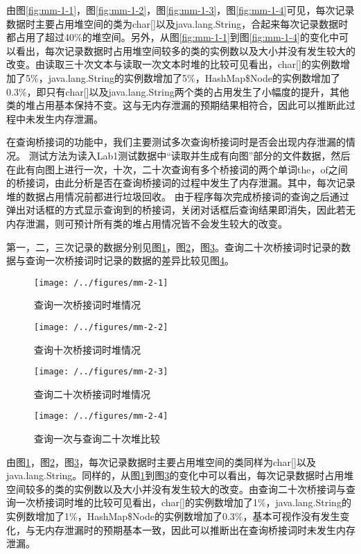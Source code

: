 由图\ref{fig:mm-1-1}，图\ref{fig:mm-1-2}，图\ref{fig:mm-1-3}，图\ref{fig:mm-1-4}可见，每次记录数据时主要占用堆空间的类为char[]以及java.lang.String，合起来每次记录数据时都占用了超过40\%的堆空间。另外，从图\ref{fig:mm-1-1}到图\ref{fig:mm-1-4}的变化中可以看出，每次记录数据时占用堆空间较多的类的实例数以及大小并没有发生较大的改变。由读取三十次文本与读取一次文本时堆的比较可见看出，char[]的实例数增加了5\%，java.lang.String的实例数增加了5\%，HashMap\$Node的实例数增加了0.3\%，即只有char[]以及java.lang.String两个类的占用发生了小幅度的提升，其他类的堆占用基本保持不变。这与无内存泄漏的预期结果相符合，因此可以推断此过程中未发生内存泄漏。

在查询桥接词的功能中，我们主要测试多次查询桥接词时是否会出现内存泄漏的情况。
测试方法为读入Lab1测试数据中“读取并生成有向图”部分的文件数据，然后在此有向图上进行一次，十次，二十次查询有多个桥接词的两个单词the，of之间的桥接词，由此分析是否在查询桥接词的过程中发生了内存泄漏。其中，每次记录堆的数据占用情况前都进行垃圾回收。
由于程序每次完成桥接词的查询之后通过弹出对话框的方式显示查询到的桥接词，关闭对话框后查询结果即消失，因此若无内存泄漏，则可预计所有类的堆占用情况皆不会发生较大的改变。

第一，二，三次记录的数据分别见图\ref{fig:mm-2-1}，图\ref{fig:mm-2-2}，图\ref{fig:mm-2-3}。查询二十次桥接词时记录的数据与查询一次桥接词时记录的数据的差异比较见图\ref{fig:mm-2-4}。

\begin{figure}
\centering
\texttt{[image: /../figures/mm-2-1]}
\caption{查询一次桥接词时堆情况}
\label{fig:mm-2-1}
\end{figure}

\begin{figure}
\centering
\texttt{[image: /../figures/mm-2-2]}
\caption{查询十次桥接词时堆情况}
\label{fig:mm-2-2}
\end{figure}

\begin{figure}
\centering
\texttt{[image: /../figures/mm-2-3]}
\caption{查询二十次桥接词时堆情况}
\label{fig:mm-2-3}
\end{figure}

\begin{figure}
\centering
\texttt{[image: /../figures/mm-2-4]}
\caption{查询一次与查询二十次堆比较}
\label{fig:mm-2-4}
\end{figure}

由图\ref{fig:mm-2-1}，图\ref{fig:mm-2-2}，图\ref{fig:mm-2-3}，每次记录数据时主要占用堆空间的类同样为char[]以及java.lang.String。同样的，从图\ref{fig:mm-2-1}到图\ref{fig:mm-2-3}的变化中可以看出，每次记录数据时占用堆空间较多的类的实例数以及大小并没有发生较大的改变。由查询二十次桥接词与查询一次桥接词时堆的比较可见看出，char[]的实例数增加了1\%，java.lang.String的实例数增加了1\%，HashMap\$Node的实例数增加了0.3\%，基本可视作没有发生变化，与无内存泄漏时的预期基本一致，因此可以推断出在查询桥接词时未发生内存泄漏。

